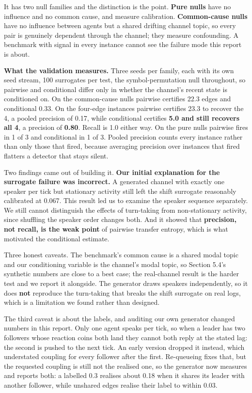 \documentclass[11pt]{article}
\begin{document}
It has two null families and the distinction is the point. \textbf{Pure nulls} have no influence and no common cause, and measure calibration. \textbf{Common-cause nulls} have no influence between agents but a shared drifting channel topic, so every pair is genuinely dependent through the channel; they measure confounding. A benchmark with signal in every instance cannot see the failure mode this report is about.

\textbf{What the validation measures.} Three seeds per family, each with its own seed stream, 100 surrogates per test, the symbol-permutation null throughout, so pairwise and conditional differ only in whether the channel's recent state is conditioned on. On the common-cause nulls pairwise certifies 22.3 edges and conditional 0.33. On the four-edge instances pairwise certifies 23.3 to recover the 4, a pooled precision of 0.17, while conditional certifies \textbf{5.0 and still recovers all 4}, a precision of \textbf{0.80}. Recall is 1.0 either way. On the pure nulls pairwise fires in 1 of 3 and conditional in 1 of 3. Pooled precision counts every instance rather than only those that fired, because averaging precision over instances that fired flatters a detector that stays silent.

Two findings came out of building it. \textbf{Our initial explanation for the surrogate failure was incorrect.} A generated channel with exactly one speaker per tick but stationary activity still left the shift surrogate reasonably calibrated at 0.067. This result led us to examine the speaker sequence separately. We still cannot distinguish the effects of turn-taking from non-stationary activity, since shuffling the speaker order changes both. And it showed that \textbf{precision, not recall, is the weak point} of pairwise transfer entropy, which is what motivated the conditional estimate.

Three honest caveats. The benchmark's common cause is a shared modal topic and our conditioning variable is the channel's modal topic, so Section 5.4's synthetic numbers are close to a best case; the real-channel result is the harder test and we report it alongside. The generator draws speakers independently, so it does \textbf{not} reproduce the turn-taking that breaks the shift surrogate on real logs, which is a limitation we found rather than designed.

The third caveat is about the labels, and auditing our own generator changed numbers in this report. Only one agent speaks per tick, so when a leader has two followers whose reaction coins both land they cannot both reply at the stated lag: the second is pushed to the next tick. An early version dropped it instead, which understated coupling for every follower after the first. Re-queueing fixes that, but the requested coupling is still not the realised one, so the generator now measures and reports both: a labelled 0.3 realises about 0.18 when it shares its leader with another follower, while unshared edges realise their label to within 0.03.
\end{document}

